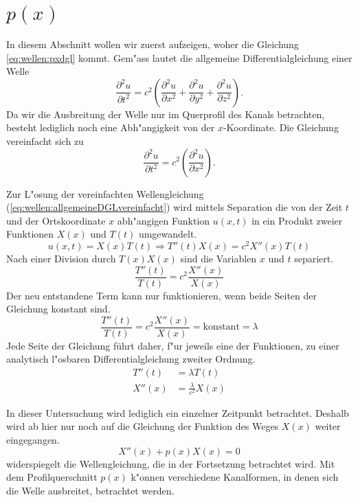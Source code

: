 \section{\texorpdfstring{$p(x)$}{p(x)}}
In diesem Abschnitt wollen wir zuerst aufzeigen, woher die Gleichung 
\ref{eq:wellen:pxdgl} kommt. Gem"ass \cite{wellen:smirnow2} lautet 
die allgemeine Differentialgleichung einer Welle
\begin{equation*}
	\frac{\partial^2 u}{\partial t^2}
	=
	c^2
	\left(
		\frac{\partial^2 u}{\partial x^2} 
		+ \frac{\partial^2 u}{\partial y^2} 
		+ \frac{\partial^2 u}{\partial z^2}
	\right).
	\label{eq:wellen:allgemeineDGL}
\end{equation*}
Da wir die Ausbreitung der Welle nur im Querprofil des Kanals betrachten, 
besteht lediglich noch eine Abh"angigkeit von der $x$-Koordinate. Die Gleichung 
vereinfacht sich zu
\begin{equation}
	\frac{\partial^2 u}{\partial t^2}
	=
	c^2
	\left(
		\frac{\partial^2 u}{\partial x^2} 
	\right).
	\label{eq:wellen:allgemeineDGLvereinfacht}
\end{equation}

Zur L"osung der vereinfachten Wellengleichung 
(\ref{eq:wellen:allgemeineDGLvereinfacht}) wird mittels Separation die von der 
Zeit $t$ und der Ortskoordinate $x$ abh"angigen Funktion $u(x,t)$ in ein 
Produkt zweier Funktionen $X(x)$ und $T(t)$ umgewandelt.
\begin{equation*}
	u (x,t) = X(x) T(t)
	\Rightarrow T''(t) X(x) = c^2 X''(x)T(t)
\end{equation*}
Nach einer Division durch $T(x)X(x)$ sind die Variablen $x$ und $t$ separiert.
\begin{equation*}
	\frac{T''(t)}{T(t)}
	=
	c^2 \frac{X''(x)}{X(x)}
\end{equation*}
Der neu entstandene Term kann nur funktionieren, wenn beide Seiten der 
Gleichung konstant sind.
\begin{equation*}
	\frac{T''(t)}{T(t)}
	=
	c^2 \frac{X''(x)}{X(x)} = \text{konstant} = \lambda
\end{equation*}
Jede Seite der Gleichung führt daher, f"ur jeweils eine der Funktionen, zu 
einer analytisch l"osbaren Differentialgleichung zweiter Ordnung.
\begin{align*}
	T''(t) &= \lambda T(t) \\
	X''(x) &= \frac{\lambda}{c^2}X(x)
\end{align*}

In dieser Untersuchung wird lediglich ein einzelner Zeitpunkt betrachtet.
Deshalb wird ab hier nur noch auf die Gleichung der Funktion des Weges $X(x)$
weiter eingegangen.
\begin{equation*}
	X''(x) + p(x) X(x) = 0
\end{equation*}
widerspiegelt die Wellengleichung, die in der Fortsetzung betrachtet wird. Mit 
dem Profilquerschnitt $p(x)$ k"onnen verschiedene Kanalformen, in denen 
sich die Welle ausbreitet, betrachtet werden.

